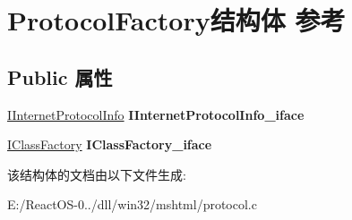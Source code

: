 \hypertarget{struct_protocol_factory}{}\section{Protocol\+Factory结构体 参考}
\label{struct_protocol_factory}
\subsection*{Public 属性}
\begin{DoxyCompactItemize}
\item 
\mbox{\label{struct_protocol_factory_a0e262df2867f1e6a514a49084546513f}} 
\hyperlink{interface_i_internet_protocol_info}{I\+Internet\+Protocol\+Info} {\bfseries I\+Internet\+Protocol\+Info\+\_\+iface}
\item 
\mbox{\label{struct_protocol_factory_a7ca5bc184fbf212f1bf9585374be29bc}} 
\hyperlink{interface_i_class_factory}{I\+Class\+Factory} {\bfseries I\+Class\+Factory\+\_\+iface}
\end{DoxyCompactItemize}


该结构体的文档由以下文件生成\+:\begin{DoxyCompactItemize}
\item 
E\+:/\+React\+O\+S-\/0../dll/win32/mshtml/protocol.\+c\end{DoxyCompactItemize}
